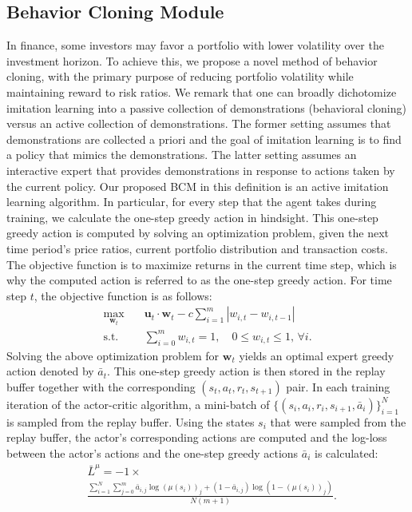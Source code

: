 \documentclass{article}
\begin{document}
\subsection{Behavior Cloning Module}\label{sec3.3}
In finance, some investors may favor a portfolio with lower volatility over the investment horizon. To achieve this, we propose a novel method of behavior cloning, with the primary purpose of reducing portfolio volatility while maintaining reward to risk ratios. We remark that one can broadly dichotomize  imitation learning into a passive collection of demonstrations (behavioral cloning) versus an active collection of demonstrations. The former setting \cite{abbeel2004apprenticeship, ross2011reduction} assumes that demonstrations are collected a priori and the goal of imitation learning is to find a policy that mimics the demonstrations. The latter setting \cite{daume2009search, sun2017deeply} assumes an interactive expert that provides demonstrations in response to actions taken by the current policy. Our proposed BCM in this definition is an active imitation learning algorithm.  
In particular, for every step that the agent takes during training, we calculate the one-step greedy action in hindsight. This one-step greedy action is computed by solving an optimization problem, given the next time period's price ratios, current portfolio distribution and transaction costs. The objective function is to maximize returns in the current time step, which is why the computed action is referred to as the one-step greedy action. For time step $t$, the objective function is as follows: 
\begin{equation}\label{expert}
\begin{aligned}
    \max_{\mathbf{w}_{t}}&\quad\mathbf{u}_{t}\cdot\mathbf{w}_{t}-c\textstyle\sum_{i=1}^m|{w}_{i,t}-{w}_{i,t-1}|\\
    \text{s.t.}&\quad \textstyle\sum_{i=0}^m w_{i,t}=1,\quad 0\leq w_{i,t}\leq1,\,\forall i.
\end{aligned}
\end{equation}
Solving the above optimization problem for $\mathbf{w}_t$ yields an optimal expert greedy action denoted by $\bar{a}_t$. This one-step greedy action is then stored in the replay buffer together with the corresponding $(s_t, a_t, r_t, s_{t+1})$ pair. In each training iteration of the actor-critic algorithm, a mini-batch of $\{(s_i, a_i, r_i, s_{i+1}, \bar{a}_i)\}_{i=1}^N$ is sampled from the replay buffer. Using the states $s_i$ that were sampled from the replay buffer, the actor's corresponding actions are computed and the log-loss between the actor's actions and the one-step greedy actions $\bar{a}_i$ is calculated: 
\vspace{-0.06in}
\begin{equation}\label{expert_loss}
    \begin{aligned}
        &\bar{L}^\mu=-1\times\\&\frac{\sum_{i=1}^N\sum_{j=0}^m \bar{a}_{i,j}\log(\mu(s_i))_j+(1-\bar{a}_{i,j})\log(1-(\mu(s_i))_j)}{N(m+1)}.
    \end{aligned}
\end{equation}
\end{document}
